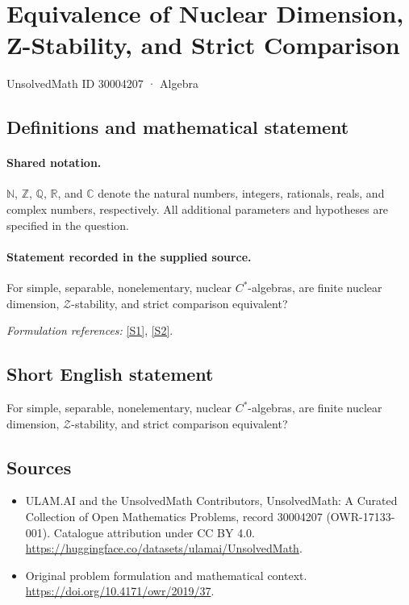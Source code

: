 \documentclass[11pt]{article}
\newcommand{\sref}[2]{\hyperlink{source:#1:#2}{[S#2]}}
\begin{document}
\setcounter{section}{30004206}
\section{Equivalence of Nuclear Dimension, Z-Stability, and Strict Comparison}\label{30004207}
{\small UnsolvedMath ID 30004207 · Algebra}
\subsection{Definitions and mathematical statement}

\paragraph{Shared notation.}$\mathbb N$, $\mathbb Z$, $\mathbb Q$, $\mathbb R$, and $\mathbb C$ denote the natural numbers, integers, rationals, reals, and complex numbers, respectively. All additional parameters and hypotheses are specified in the question.


\paragraph{Statement recorded in the supplied source.}
For simple, separable, nonelementary, nuclear $C^*$-algebras, are finite nuclear dimension, $\mathcal Z$-stability, and strict comparison equivalent?
\par\smallskip\textit{Formulation references:} \sref{30004207}{1}, \sref{30004207}{2}.
\subsection{Short English statement}
For simple, separable, nonelementary, nuclear $C^*$-algebras, are finite nuclear dimension, $\mathcal Z$-stability, and strict comparison equivalent?
\subsection{Sources}
\begin{itemize}
\item[\hypertarget{source:30004207:1}{S1}] ULAM.AI and the UnsolvedMath Contributors, UnsolvedMath: A Curated Collection of Open Mathematics Problems, record 30004207 (OWR-17133-001). Catalogue attribution under CC BY 4.0.
\url{https://huggingface.co/datasets/ulamai/UnsolvedMath}.
\item[\hypertarget{source:30004207:2}{S2}] Original problem formulation and mathematical context.
\url{https://doi.org/10.4171/owr/2019/37}.
\end{itemize}
\label{end:30004207}
\end{document}

